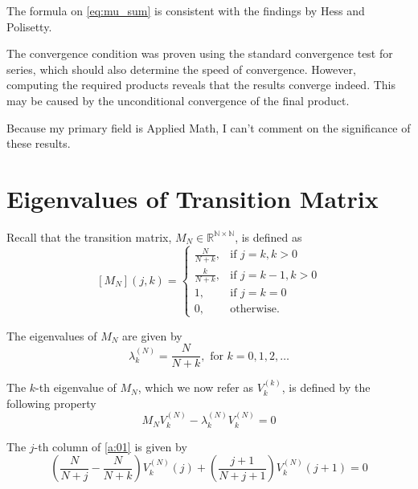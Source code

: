 \documentclass{article}
\newcommand{\N}{\mathbb{N}}
\newcommand{\R}{\mathbb{R}}
\newcommand{\ppar}[1]{\left( #1 \right)}
\newcommand{\spar}[1]{\left[ #1 \right]}
\begin{document}
The formula on \eqref{eq:mu_sum} is consistent with the findings by Hess and Polisetty.

The convergence condition was proven using the standard convergence test for series, which should also determine the speed of convergence.
%
However, computing the required products reveals that the results converge indeed.
%
This may be caused by the unconditional convergence of the final product.

Because my primary field is Applied Math, I can't comment on the significance of these results. 


\newpage

\appendix 

\section{Eigenvalues of Transition Matrix}
\label{ap:eigenvalues}

Recall that the transition matrix, $M_N\in \R^{\N\times \N}$, is defined as
\begin{equation}
    \spar{M_N}(j,k) = 
    \begin{cases}
        \frac{N}{N+k}, &\text{if } j= k, k>0 \\
        \frac{k}{N+k}, &\text{if } j= k-1, k>0 \\
        1, &\text{if } j= k=0 \\
        0, &\text{otherwise.}
    \end{cases}
\end{equation}

The eigenvalues of $M_N$ are given by
\begin{equation}
    \lambda^{(N)}_k = \frac{N}{N+k}, \text{ for } k=0,1, 2, \dots
\end{equation}

The $k$-th eigenvalue of $M_N$, which we now refer as $V_k^{(k)}$, is defined by the following property
\begin{equation}
    M_N V_k^{(N)} - \lambda^{(N)}_k V_k^{(N)} = 0
    \label{a:01}
\end{equation}

The $j$-th column of \eqref{a:01} is given by
\begin{equation}
    \ppar{\frac{N}{N+j}-\frac{N}{N+k} } V_k^{(N)}(j) + \ppar{\frac{j+1}{N+j+1}}V_k^{(N)}(j+1) = 0
    \label{a:induction}
\end{equation}
\end{document}
